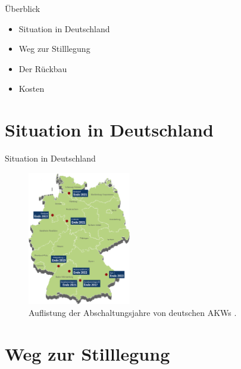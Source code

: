 


\frame{\maketitle}



\begin{frame}{ Überblick }
  \begin{itemize}
    \setlength\itemsep{1.2em}
      \item{ Situation in Deutschland }
      \item{ Weg zur Stilllegung }
      \item{ Der Rückbau }
      \item{ Kosten }
  \end{itemize}
\end{frame}



\section{Situation in Deutschland}



\begin{frame}{ Situation in Deutschland }
  \begin{figure}
     \centering
     \includegraphics[width=0.4\textwidth]{./bilder/akw_abschaltung_karte.png}
     \caption{ Auflistung der Abschaltungsjahre von deutschen AKWs \cite{ karte_abschaltungen }. }
     \label{ fig: karte_abschaltungen }
   \end{figure}
\end{frame}



\section{Weg zur Stilllegung}



